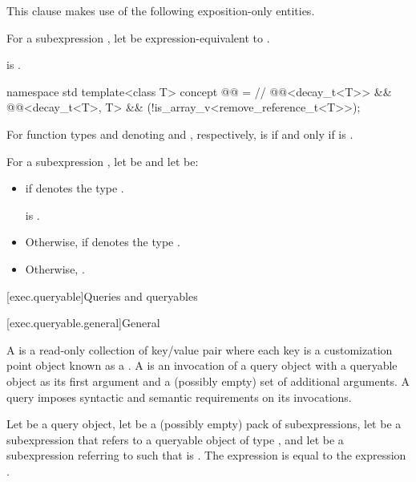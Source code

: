 \pnum
This clause makes use of the following exposition-only entities.

\pnum
For a subexpression ,
let  be
expression-equivalent to .

\mandates
{} is .

\pnum
\begin{codeblock}
namespace std {
  template<class T>
    concept @@ =                                     // \expos
      @@<decay_t<T>> &&
      @@<decay_t<T>, T> &&
      (!is_array_v<remove_reference_t<T>>);
}
\end{codeblock}

\pnum
For function types  and  denoting
 and , respectively,
 is  if and only if
is .

\pnum
For a subexpression ,
let  be  and
let  be:
\begin{itemize}
\item
{} if  denotes the type .

\mandates
{} is .
\item
Otherwise,
if  denotes the type .
\item
Otherwise, .
\end{itemize}

[exec.queryable]{Queries and queryables}

[exec.queryable.general]{General}

\pnum
A  is
a read-only collection of key/value pair
where each key is a customization point object known as a .
A  is an invocation of a query object
with a queryable object as its first argument and
a (possibly empty) set of additional arguments.
A query imposes syntactic and semantic requirements on its invocations.

\pnum
Let  be a query object,
let  be a (possibly empty) pack of subexpressions,
let  be a subexpression
that refers to a queryable object  of type , and
let  be a subexpression referring to 
such that  is .
The expression  is equal to
the expression .


